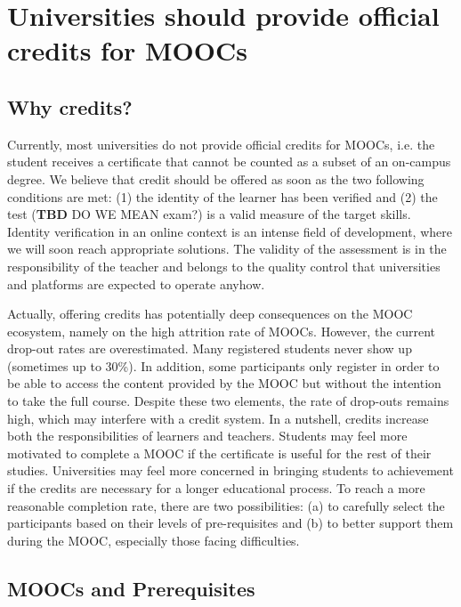 \section{Universities should provide official credits for MOOCs}
\label{sec:credit}
 
\subsection{Why credits?}

Currently, most universities do not provide official credits for MOOCs,
i.e. the student receives a certificate that cannot be counted as a
subset of an on-campus degree. We believe that credit should be offered
as soon as the two following conditions are met: (1) the identity of the
learner has been verified and (2) the test (\textbf{TBD} DO WE MEAN exam?) is a valid
measure of the target skills. Identity verification in an online context
is an intense field of development, where we will soon reach appropriate
solutions. The validity of the assessment is in the responsibility of
the teacher and belongs to the quality control that universities and
platforms are expected to operate anyhow.

Actually, offering credits has potentially deep consequences on the MOOC
ecosystem, namely on the high attrition rate of MOOCs. However, the
current drop-out rates are overestimated. Many registered students never
show up (sometimes up to 30\%). In addition, some participants only
register in order to be able to access the content provided by the MOOC
but without the intention to take the full course. Despite these two
elements, the rate of drop-outs remains high, which may interfere with a
credit system. In a nutshell, credits increase both the responsibilities
of learners and teachers. Students may feel more motivated to complete a
MOOC if the certificate is useful for the rest of their
studies. Universities may feel more concerned in bringing students to
achievement if the credits are necessary for a longer educational
process.  To reach a more reasonable completion rate, there are two
possibilities: (a) to carefully select the participants based on their
levels of pre-requisites and (b) to better support them during the MOOC,
especially those facing difficulties.


\subsection{MOOCs and Prerequisites}

